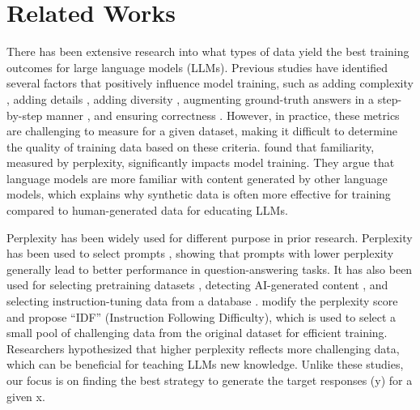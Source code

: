 \section{Related Works}
% 
There has been extensive research into what types of data yield the best training outcomes for large language models (LLMs). Previous studies have identified several factors that positively influence model training, such as adding complexity \citep{xu2023wizardlm}, adding details \citep{zhang2024distillation, kang2023knowledgeaugmented, li2022explanations}, adding diversity \citep{luo2023wizardcoderempoweringcodelarge}, augmenting ground-truth answers in a step-by-step manner \citep{hsieh2023distilling, ho2022large, magister-etal-2023-teaching, fu2023specializing, ranaldi-freitas-2024-aligning}, and ensuring correctness \citep{trinh2024solving, ranaldi-freitas-2024-aligning}. However, in practice, these metrics are challenging to measure for a given dataset, making it difficult to determine the quality of training data based on these criteria. \citet{ren2024learn} found that familiarity, measured by perplexity, significantly impacts model training. They argue that language models are more familiar with content generated by other language models, which explains why synthetic data is often more effective for training compared to human-generated data for educating LLMs. 

Perplexity has been widely used for different purpose in prior research. Perplexity has been used to select prompts \citep{gonen2022demystifying}, showing that prompts with lower perplexity generally lead to better performance in question-answering tasks. It has also been used for selecting pretraining datasets \citep{de2022bertin}, detecting AI-generated content \citep{xu2024detecting, hu2020systematic}, and selecting instruction-tuning data from a database \citep{mekala2024smaller}. \citet{li-etal-2024-quantity} modify the perplexity score and propose “IDF” (Instruction Following Difficulty), which is used to select a small pool of challenging data from the original dataset for efficient training. Researchers hypothesized that higher perplexity reflects more challenging data, which can be beneficial for teaching LLMs new knowledge. Unlike these studies, our focus is on finding the best strategy to generate the target responses (y) for a given x.  

